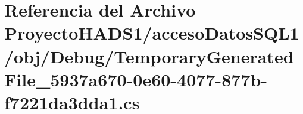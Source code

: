 \hypertarget{_proyecto_h_a_d_s1_2acceso_datos_s_q_l1_2obj_2_debug_2_temporary_generated_file__5937a670-0e60-4077-877b-f7221da3dda1_8cs}{}\section{Referencia del Archivo Proyecto\+H\+A\+D\+S1/acceso\+Datos\+S\+Q\+L1/obj/\+Debug/\+Temporary\+Generated\+File\+\_\+5937a670-\/0e60-\/4077-\/877b-\/f7221da3dda1.cs}
\label{_proyecto_h_a_d_s1_2acceso_datos_s_q_l1_2obj_2_debug_2_temporary_generated_file__5937a670-0e60-4077-877b-f7221da3dda1_8cs}
